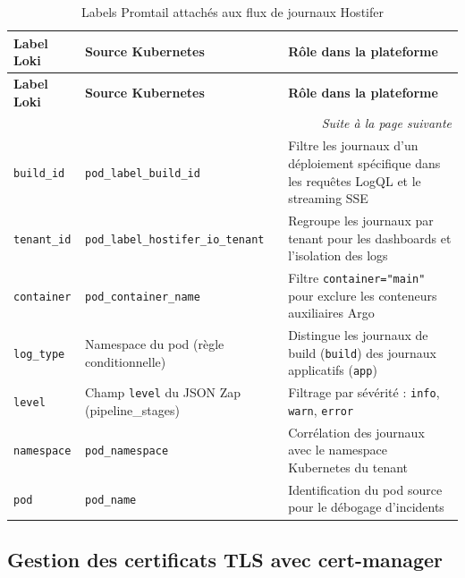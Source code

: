 \begin{longtable}{|p{3cm}|p{3.5cm}|p{6.5cm}|}
\caption{Labels Promtail attachés aux flux de journaux Hostifer}
\label{tab:promtail-labels} \\

\hline
\textbf{Label Loki} & \textbf{Source Kubernetes} & \textbf{Rôle dans la plateforme} \\
\hline
\endfirsthead

\hline
\textbf{Label Loki} & \textbf{Source Kubernetes} & \textbf{Rôle dans la plateforme} \\
\hline
\endhead

\hline
\multicolumn{3}{r|}{\small\textit{Suite à la page suivante}} \\
\endfoot

\hline
\endlastfoot

\texttt{build\_id}
  & \texttt{pod\_label\_build\_id}
  & Filtre les journaux d'un déploiement spécifique dans les requêtes LogQL et le streaming SSE \\
\hline
\texttt{tenant\_id}
  & \texttt{pod\_label\_hostifer\_io\_tenant}
  & Regroupe les journaux par tenant pour les dashboards et l'isolation des logs \\
\hline
\texttt{container}
  & \texttt{pod\_container\_name}
  & Filtre \texttt{container="main"} pour exclure les conteneurs auxiliaires Argo \\
\hline
\texttt{log\_type}
  & Namespace du pod (règle conditionnelle)
  & Distingue les journaux de build (\texttt{build}) des journaux applicatifs (\texttt{app}) \\
\hline
\texttt{level}
  & Champ \texttt{level} du JSON Zap (pipeline\_stages)
  & Filtrage par sévérité : \texttt{info}, \texttt{warn}, \texttt{error} \\
\hline
\texttt{namespace}
  & \texttt{pod\_namespace}
  & Corrélation des journaux avec le namespace Kubernetes du tenant \\
\hline
\texttt{pod}
  & \texttt{pod\_name}
  & Identification du pod source pour le débogage d'incidents \\
\hline

\end{longtable}

\subsection{Gestion des certificats TLS avec cert-manager}

